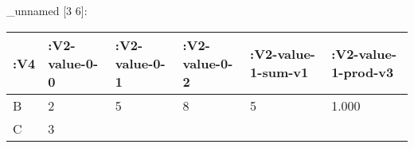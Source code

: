 \documentclass[]{article}
\begin{document}
\_unnamed {[}3 6{]}:

\begin{longtable}[]{@{}llllll@{}}
\toprule
\begin{minipage}[b]{0.05\columnwidth}\raggedright\strut
:V4\strut
\end{minipage} & \begin{minipage}[b]{0.14\columnwidth}\raggedright\strut
:V2-value-0-0\strut
\end{minipage} & \begin{minipage}[b]{0.14\columnwidth}\raggedright\strut
:V2-value-0-1\strut
\end{minipage} & \begin{minipage}[b]{0.14\columnwidth}\raggedright\strut
:V2-value-0-2\strut
\end{minipage} & \begin{minipage}[b]{0.18\columnwidth}\raggedright\strut
:V2-value-1-sum-v1\strut
\end{minipage} & \begin{minipage}[b]{0.19\columnwidth}\raggedright\strut
:V2-value-1-prod-v3\strut
\end{minipage}\tabularnewline
\midrule
\endhead
\begin{minipage}[t]{0.05\columnwidth}\raggedright\strut
B\strut
\end{minipage} & \begin{minipage}[t]{0.14\columnwidth}\raggedright\strut
2\strut
\end{minipage} & \begin{minipage}[t]{0.14\columnwidth}\raggedright\strut
5\strut
\end{minipage} & \begin{minipage}[t]{0.14\columnwidth}\raggedright\strut
8\strut
\end{minipage} & \begin{minipage}[t]{0.18\columnwidth}\raggedright\strut
5\strut
\end{minipage} & \begin{minipage}[t]{0.19\columnwidth}\raggedright\strut
1.000\strut
\end{minipage}\tabularnewline
\begin{minipage}[t]{0.05\columnwidth}\raggedright\strut
C\strut
\end{minipage} & \begin{minipage}[t]{0.14\columnwidth}\raggedright\strut
3\strut
\end{minipage} & \begin{minipage}[t]{0.14\columnwidth}\raggedright\strut

\end{minipage}
\end{longtable}
\end{document}
